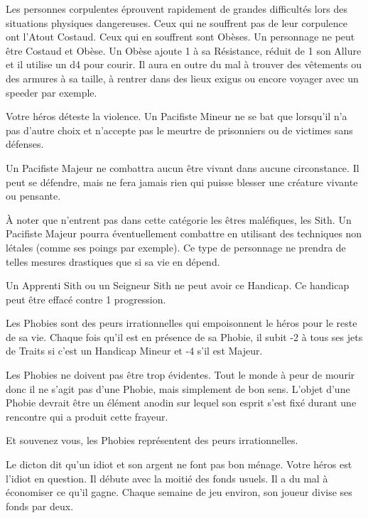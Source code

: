 \begin{description}[align=left]
    \item [Obèse (Mineur)]
        Les personnes corpulentes éprouvent rapidement de grandes difficultés lors des situations physiques dangereuses. Ceux qui ne souffrent pas de leur corpulence ont l’Atout Costaud. Ceux qui en souffrent sont Obèses. Un personnage ne peut être Costaud et Obèse. Un Obèse ajoute 1 à sa Résistance, réduit de 1 son Allure et il utilise un d4 pour courir. Il aura en outre du mal à trouver des vêtements ou des armures à sa taille, à rentrer dans des lieux exigus ou encore voyager avec un speeder par exemple.

    \item [Pacifiste (Mineur ou Majeur)]
        Votre héros déteste la violence. Un Pacifiste Mineur ne se bat que lorsqu’il n’a pas d’autre choix et n’accepte pas le meurtre de prisonniers ou de victimes sans défenses. 

        Un Pacifiste Majeur ne combattra aucun être vivant dans aucune circonstance. Il peut se défendre, mais ne fera jamais rien qui puisse blesser une créature vivante ou pensante. 

        À noter que n’entrent pas dans cette catégorie les êtres maléfiques, les Sith. Un Pacifiste Majeur pourra éventuellement combattre en utilisant des techniques non létales (comme ses poings par exemple). Ce type de personnage ne prendra de telles mesures drastiques que si sa vie en dépend.

        Un Apprenti Sith ou un Seigneur Sith ne peut avoir ce Handicap. Ce handicap peut être effacé contre 1 progression.

    \item [Phobie (Mineur ou Majeur)]
        Les Phobies sont des peurs irrationnelles qui empoisonnent le héros pour le reste de sa vie. Chaque fois qu’il est en présence de sa Phobie, il subit -2 à tous ses jets de Traits si c’est un Handicap Mineur et -4 s’il est Majeur. 

        Les Phobies ne doivent pas être trop évidentes. Tout le monde à peur de mourir donc il ne s’agit pas d’une Phobie, mais simplement de bon sens. L’objet d’une Phobie devrait être un élément anodin sur lequel son esprit s’est fixé durant une rencontre qui a produit cette frayeur.

        Et souvenez vous, les Phobies représentent des peurs irrationnelles.

    \item [Poches percées (Mineur)]
        Le dicton dit qu’un idiot et son argent ne font pas bon ménage. Votre héros est l’idiot en question. Il débute avec la moitié des fonds usuels. Il a du mal à économiser ce qu’il gagne. Chaque semaine de jeu environ, son joueur divise ses fonds par deux.


\end{description}
